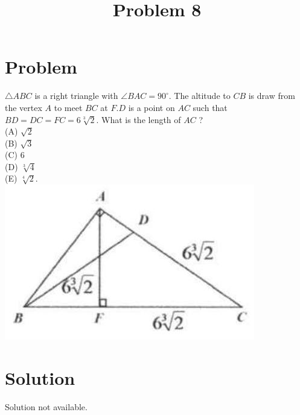 \documentclass{article}
\title{Problem 8}
\date{}
\begin{document}
\maketitle

\section*{Problem}
\(\triangle A B C\) is a right triangle with \(\angle B A C=90^{\circ}\). The altitude to \(C B\) is draw from the vertex \(A\) to meet \(B C\) at \(F . D\) is a point on \(A C\) such that \(B D=D C=F C=6 \sqrt[3]{2}\). What is the length of \(A C\) ?\\
(A) \(\sqrt{2}\)\\
(B) \(\sqrt{3}\)\\
(C) 6\\
(D) \(\sqrt[3]{4}\)\\
(E) \(\sqrt[4]{2}\).\\
\centering
\includegraphics[width=\textwidth]{images/089(2).jpg}

\section*{Solution}
Solution not available.
\end{document}
